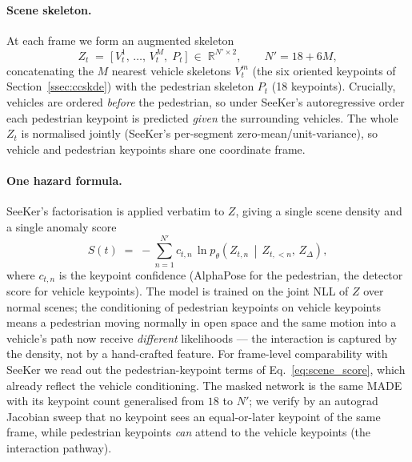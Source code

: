 \documentclass{article}
\begin{document}
\paragraph{Scene skeleton.} At each frame we form an augmented skeleton
\begin{equation}
\label{eq:scene}
Z_t \;=\; \big[\, V^{1}_t,\,\dots,\,V^{M}_t,\; P_t \,\big]
\;\in\; \mathbb{R}^{N' \times 2}, \qquad N' = 18 + 6M,
\end{equation}
concatenating the $M$ nearest vehicle skeletons $V^{m}_t$ (the six oriented
keypoints of Section~\ref{ssec:ccskde}) with the pedestrian skeleton $P_t$ (18
keypoints). Crucially, vehicles are ordered \emph{before} the pedestrian, so
under SeeKer's autoregressive order each pedestrian keypoint is predicted
\emph{given} the surrounding vehicles. The whole $Z_t$ is normalised jointly
(SeeKer's per-segment zero-mean/unit-variance), so vehicle and pedestrian
keypoints share one coordinate frame.

\paragraph{One hazard formula.} SeeKer's factorisation is applied verbatim to
$Z$, giving a single scene density and a single anomaly score
\begin{equation}
\label{eq:scene_score}
S(t) \;=\; -\!\sum_{n=1}^{N'} c_{t,n}\,
\ln p_{\theta}\!\left(Z_{t,n}\,\middle|\,Z_{t,<n},\,Z_{\Delta}\right),
\end{equation}
where $c_{t,n}$ is the keypoint confidence (AlphaPose for the pedestrian, the
detector score for vehicle keypoints). The model is trained on the joint NLL of
$Z$ over normal scenes; the conditioning of pedestrian keypoints on vehicle
keypoints means a pedestrian moving normally in open space and the same motion
into a vehicle's path now receive \emph{different} likelihoods --- the
interaction is captured by the density, not by a hand-crafted feature. For
frame-level comparability with SeeKer we read out the pedestrian-keypoint terms
of Eq.~\ref{eq:scene_score}, which already reflect the vehicle conditioning. The
masked network is the same MADE with its keypoint count generalised from $18$ to
$N'$; we verify by an autograd Jacobian sweep that no keypoint sees an
equal-or-later keypoint of the same frame, while pedestrian keypoints \emph{can}
attend to the vehicle keypoints (the interaction pathway).
\end{document}

